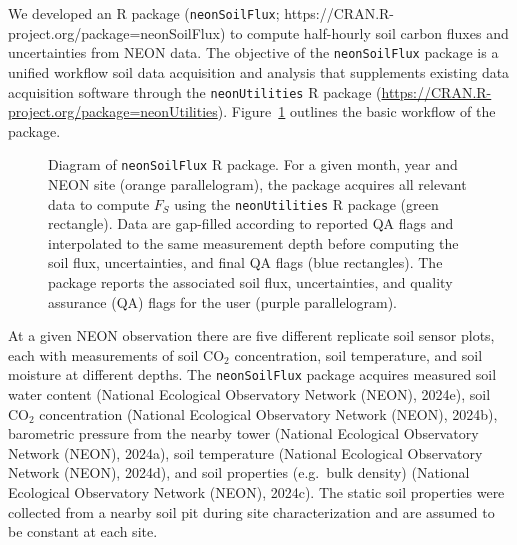 \documentclass[
  letterpaper,
  DIV=11,
  numbers=noendperiod]{scrartcl}
\begin{document}
We developed an R package (\texttt{neonSoilFlux};
https://CRAN.R-project.org/package=neonSoilFlux) to compute half-hourly
soil carbon fluxes and uncertainties from NEON data. The objective of
the \texttt{neonSoilFlux} package is a unified workflow soil data
acquisition and analysis that supplements existing data acquisition
software through the \texttt{neonUtilities} R package
(\url{https://CRAN.R-project.org/package=neonUtilities}).
Figure~\ref{fig-package-diagram} outlines the basic workflow of the
package.

\begin{figure}


\caption{\label{fig-package-diagram}Diagram of \texttt{neonSoilFlux} R
package. For a given month, year and NEON site (orange parallelogram),
the package acquires all relevant data to compute \(F_{S}\) using the
\texttt{neonUtilities} R package (green rectangle). Data are gap-filled
according to reported QA flags and interpolated to the same measurement
depth before computing the soil flux, uncertainties, and final QA flags
(blue rectangles). The package reports the associated soil flux,
uncertainties, and quality assurance (QA) flags for the user (purple
parallelogram).}

\end{figure}%

At a given NEON observation there are five different replicate soil
sensor plots, each with measurements of soil CO\(_{2}\) concentration,
soil temperature, and soil moisture at different depths. The
\texttt{neonSoilFlux} package acquires measured soil water content
(National Ecological Observatory Network (NEON), 2024e), soil CO\(_{2}\)
concentration (National Ecological Observatory Network (NEON), 2024b),
barometric pressure from the nearby tower (National Ecological
Observatory Network (NEON), 2024a), soil temperature (National
Ecological Observatory Network (NEON), 2024d), and soil properties
(e.g.~bulk density) (National Ecological Observatory Network (NEON),
2024c). The static soil properties were collected from a nearby soil pit
during site characterization and are assumed to be constant at each
site.
\end{document}
